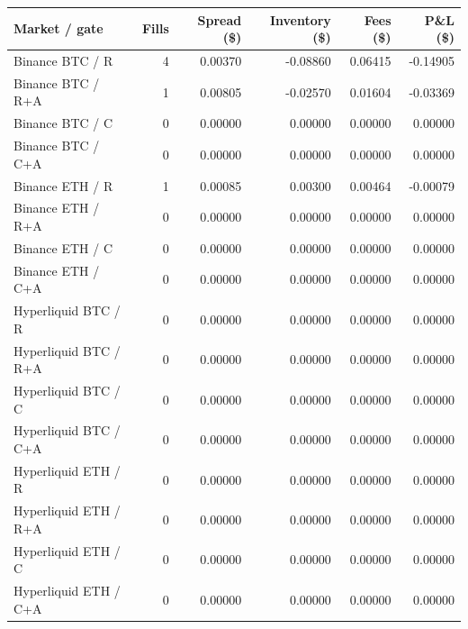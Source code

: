 \begin{tabular}{lrrrrr}
\toprule
Market / gate & Fills & Spread (\$) & Inventory (\$) & Fees (\$) & P\&L (\$) \\
\midrule
Binance BTC / R & 4 & 0.00370 & -0.08860 & 0.06415 & -0.14905 \\
Binance BTC / R+A & 1 & 0.00805 & -0.02570 & 0.01604 & -0.03369 \\
Binance BTC / C & 0 & 0.00000 & 0.00000 & 0.00000 & 0.00000 \\
Binance BTC / C+A & 0 & 0.00000 & 0.00000 & 0.00000 & 0.00000 \\
Binance ETH / R & 1 & 0.00085 & 0.00300 & 0.00464 & -0.00079 \\
Binance ETH / R+A & 0 & 0.00000 & 0.00000 & 0.00000 & 0.00000 \\
Binance ETH / C & 0 & 0.00000 & 0.00000 & 0.00000 & 0.00000 \\
Binance ETH / C+A & 0 & 0.00000 & 0.00000 & 0.00000 & 0.00000 \\
Hyperliquid BTC / R & 0 & 0.00000 & 0.00000 & 0.00000 & 0.00000 \\
Hyperliquid BTC / R+A & 0 & 0.00000 & 0.00000 & 0.00000 & 0.00000 \\
Hyperliquid BTC / C & 0 & 0.00000 & 0.00000 & 0.00000 & 0.00000 \\
Hyperliquid BTC / C+A & 0 & 0.00000 & 0.00000 & 0.00000 & 0.00000 \\
Hyperliquid ETH / R & 0 & 0.00000 & 0.00000 & 0.00000 & 0.00000 \\
Hyperliquid ETH / R+A & 0 & 0.00000 & 0.00000 & 0.00000 & 0.00000 \\
Hyperliquid ETH / C & 0 & 0.00000 & 0.00000 & 0.00000 & 0.00000 \\
Hyperliquid ETH / C+A & 0 & 0.00000 & 0.00000 & 0.00000 & 0.00000 \\
\bottomrule
\end{tabular}
